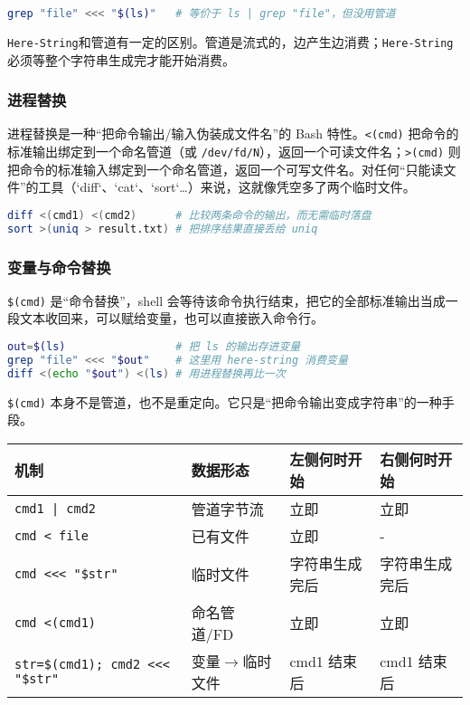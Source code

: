 \begin{lstlisting}[language=bash]
grep "file" <<< "$(ls)"   # 等价于 ls | grep "file"，但没用管道
\end{lstlisting}

\texttt{Here-String}和管道有一定的区别。管道是流式的，边产生边消费；\texttt{Here-String}必须等整个字符串生成完才能开始消费。

\subsubsection{进程替换}

进程替换是一种“把命令输出/输入伪装成文件名”的 Bash 特性。\texttt{<(cmd)} 把命令的标准输出绑定到一个命名管道（或 \texttt{/dev/fd/N}），返回一个可读文件名；\texttt{>(cmd)} 则把命令的标准输入绑定到一个命名管道，返回一个可写文件名。对任何“只能读文件”的工具（`diff`、`cat`、`sort`…）来说，这就像凭空多了两个临时文件。

\begin{lstlisting}[language=bash]
diff <(cmd1) <(cmd2)      # 比较两条命令的输出，而无需临时落盘
sort >(uniq > result.txt) # 把排序结果直接丢给 uniq
\end{lstlisting}

\subsubsection*{变量与命令替换}

\texttt{\$(cmd)} 是“命令替换”，shell 会等待该命令执行结束，把它的全部标准输出当成一段文本收回来，可以赋给变量，也可以直接嵌入命令行。

\begin{lstlisting}[language=bash]
out=$(ls)                 # 把 ls 的输出存进变量
grep "file" <<< "$out"    # 这里用 here-string 消费变量
diff <(echo "$out") <(ls) # 用进程替换再比一次
\end{lstlisting}

\texttt{\$(cmd)} 本身不是管道，也不是重定向。它只是“把命令输出变成字符串”的一种手段。

\begin{table}[ht]\small
  \centering
  \begin{tabular}{llll}
    \toprule
    机制 & 数据形态 & 左侧何时开始 & 右侧何时开始 \\
    \midrule
    \texttt{cmd1 | cmd2} & 管道字节流 & 立即 & 立即 \\
    \texttt{cmd < file} & 已有文件 & 立即 & - \\
    \texttt{cmd <<< "\$str"} & 临时文件 & 字符串生成完后 & 字符串生成完后 \\
    \texttt{cmd <(cmd1)} & 命名管道/FD & 立即 & 立即 \\
    \texttt{str=\$(cmd1); cmd2 <<< "\$str"} & 变量$\rightarrow$临时文件 & cmd1 结束后 & cmd1 结束后 \\
    \bottomrule
  \end{tabular}
\end{table}

